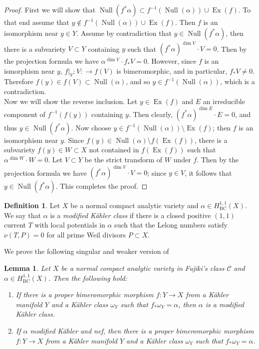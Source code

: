 \documentclass[12pt]{amsart}
\theoremstyle{plain}
\newtheorem{lemma}[theorem]{Lemma}
\theoremstyle{remark}
\theoremstyle{definition}
\def\BC{\operatorname{BC}}
\def\Null{\operatorname{Null}}
\newcommand{\<}{\leq}
\def\mcC{\mathcal{C}}
\def\Ex{\operatorname{Ex}}
\def\dim{\operatorname{dim}}
\theoremstyle{definition}
\newtheorem{definition}[theorem]{Definition}
\theoremstyle{definition}
\numberwithin{equation}{section}
\theoremstyle{remark}
\begin{document}
\begin{proof}
First we will show that $\Null(f^*\alpha)\subset f^{-1}(\Null(\alpha))\cup \Ex(f)$. To that end assume that $y\notin f^{-1}(\Null(\alpha))\cup \Ex(f)$. Then $f$ is an isomorphism near $y\in Y$. 
Assume by contradiction that $y\in \Null(f^*\alpha)$, then there is a subvariety $V\subset Y$ containing $y$ such that $(f^*\alpha)^{\dim V}\cdot V=0$. Then by the projection formula we have $\alpha^{\dim V}\cdot f_*V=0$. However, since $f$ is an ismorphism near $y$, $f|_V:V:\to f(V)$ is bimeromorphic, and in particular, $f_*V\neq 0$. Therefore $f(y)\in f(V)\subset \Null(\alpha)$, and so $y\in f^{-1}(\Null(\alpha))$, which is a contradiction.\\ 
Now we will show the reverse inclusion. Let $y\in \Ex(f)$ and $E$ an irreducible component of $f^{-1}(f(y))$ containing $y$. Then clearly, $(f^*\alpha)^{\dim E}\cdot E=0$, and thus $y\in \Null(f^*\alpha)$. Now choose $y\in f^{-1}(\Null(\alpha))\setminus\Ex(f)$; then $f$ is an isomorphism near $y$. Since $f(y)\in \Null(\alpha)\setminus f(\Ex(f))$, there is a subvariety $f(y)\in W\subset X$ not contained in $f(\Ex(f))$ such that $\alpha^{\dim W}\cdot W=0$. Let $V\subset Y$ be the strict transform of $W$ under $f$. Then by the projection formula we have $(f^*\alpha)^{\dim V}\cdot V=0$; since $y\in V$, it follows that $y\in \Null(f^*\alpha)$. This completes the proof.
         
\end{proof}




\begin{definition}\label{def:modified-kahler}
    Let $X$ be a normal compact analytic variety and $\alpha\in H^{1,1}_{\BC}(X)$. We say that $\alpha$ is a \emph{modified K\"ahler class} if there is a closed positive $(1,1)$ current $T$ with local potentials in $\alpha$ such that the Lelong numbers satisfy $\nu(T, P)=0$ for all prime Weil divisors $P\subset X$.  
\end{definition}

We prove the following singular and weaker version of \cite[Proposition 2.3]{Bou04}
\begin{lemma}\label{lem:modified-kahlerle}
Let $X$ be a normal compact analytic variety in Fujiki's class $\mcC$ and $\alpha\in H^{1,1}_{\BC}(X)$. Then the following hold:
\begin{enumerate}
    \item If there is a proper bimeromorphic morphism $f:Y\to X$ from a K\"ahler manifold $Y$ and a K\"ahler class $\omega_Y$ such that $f_*\omega_Y=\alpha$, then $\alpha$ is a modified K\"ahler class.
    \item If $\alpha$ modified K\"ahler and nef, then there is a proper bimeromorphic morphism $f:Y\to X$ from a K\"ahler manifold $Y$ and a K\"ahler class $\omega_Y$ such that $f_*\omega_Y=\alpha$.
\end{enumerate}
\end{lemma}
\end{document}
